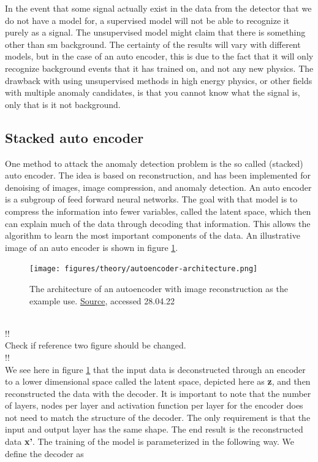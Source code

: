\documentclass[ reprint, amsmath,amssymb, aps, nofootinbib]{revtex4-2}
\begin{document}
In the event that some signal actually exist in the data from the detector that we do not have a model for, a supervised model will not be able to recognize it purely as a signal. The unsupervised model might claim that there is something other than sm background. The certainty of the results will vary with different models, but in the case of an auto encoder, this is due to the fact that it will only recognize background events that it has trained on, and not any new physics. The drawback with using unsupervised methods in high energy physics, or other fields with multiple anomaly candidates, is that you cannot know what the signal is, only that is it not background. \par 



\subsection{Stacked auto encoder}

One method to attack the anomaly detection problem is the so called (stacked) auto encoder. The idea is based on reconstruction, and has been implemented for denoising of images, image compression, and anomaly detection. 
An auto encoder is a subgroup of feed forward neural networks\cite{FYSSTK}. The goal with that model is to compress the information into fewer variables, called the latent space, which then can explain much of the data through decoding that information. This allows the algorithm to learn the most important components of the data. An illustrative image of an auto encoder is shown in figure \ref{fig:auto_en_archi}. 

\begin{figure}[H]
    \centering
    \texttt{[image: figures/theory/autoencoder-architecture.png]}
    \caption{The architecture of an autoencoder with image reconstruction as the example use. \href{https://lilianweng.github.io/posts/2018-08-12-vae/}{Source}, accessed 28.04.22}
    \label{fig:auto_en_archi}
\end{figure}
\\!!\\
Check if reference two figure should be changed.
\\!!\\

We see here in figure \ref{fig:auto_en_archi} that the input data is deconstructed through an encoder to a lower dimensional space called the latent space, depicted here as \textbf{z}, and then reconstructed the data with the decoder. It is important to note that the number of layers, nodes per layer and activation function per layer for the encoder does not need to match the structure of the decoder. The only requirement is that the input and output layer has the same shape. The end result is the reconstructed data \textbf{x'}. The training of the model is parameterized in the following way. We define the decoder as 
\end{document}
